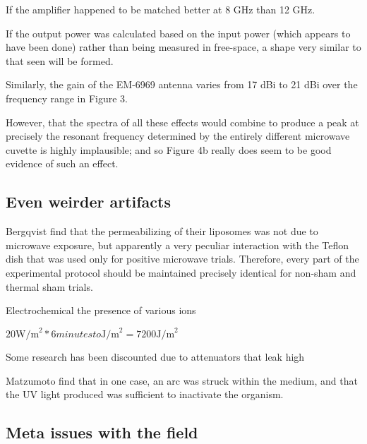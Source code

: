 \documentclass[paper.tex]{subfiles}
\begin{document}
\begin{multicols}{1}
If the amplifier happened to be matched better at 8 GHz than 12 GHz.

If the output power was calculated based on the input power (which appears to have been done) rather than being measured in free-space, a shape very similar to that seen will be formed.

Similarly, the gain of the EM-6969 antenna\cite{EM6969} varies from 17 dBi to 21 dBi over the frequency range in Figure 3.

However, that the spectra of all these effects would combine to produce a peak at precisely the resonant frequency determined by the entirely different microwave cuvette is highly implausible; and so Figure 4b really does seem to be good evidence of such an effect.


\subsection{Even weirder artifacts}

Bergqvist \cite{Effect1994a} find that the permeabilizing of their liposomes was not due to microwave exposure, but apparently a very peculiar interaction with the Teflon dish that was used only for positive microwave trials. Therefore, every part of the experimental protocol should be maintained precisely identical for non-sham and thermal sham trials.

Electrochemical the presence of various ions 



$20 \text{W/m}^2 * 6 minutes to \text{J/m}^2 = 7200 \text{J/m}^2$


Some research has been discounted due to attenuators that leak high 

Matzumoto \cite{Inactivation1991} find that in one case, an arc was struck within the medium, and that the UV light produced was sufficient to inactivate the organism.





\subsection{Meta issues with the field}



\end{multicols}
\end{document}
